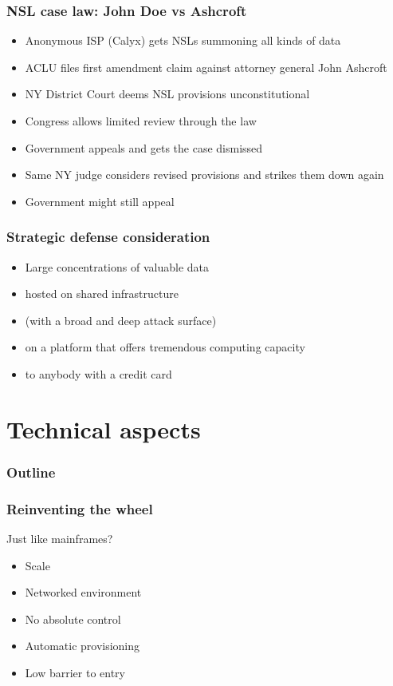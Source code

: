 \documentclass{beamer}
\begin{document}
\begin{frame}
    \frametitle{NSL case law: John Doe vs Ashcroft}
    \begin{itemize}
    \item Anonymous ISP (Calyx) gets NSLs summoning all kinds of data
    \item ACLU files first amendment claim against attorney general John Ashcroft
    \item NY District Court deems NSL provisions unconstitutional
    \item Congress allows limited review through the law
    \item Government appeals and gets the case dismissed
    \item Same NY judge considers revised provisions and strikes them down again
    \item Government might still appeal
    \end{itemize}
\end{frame}

\begin{frame}
    \frametitle{Strategic defense consideration}
    \begin{itemize}
      \item Large concentrations of valuable data
      \item hosted on shared infrastructure
      \item (with a broad and deep attack surface)
      \item on a platform that offers tremendous computing capacity
      \item to anybody with a credit card
    \end{itemize}
\end{frame}

\section{Technical aspects}

\begin{frame}
  \frametitle{Outline}
\end{frame}

\begin{frame}
    \frametitle{Reinventing the wheel}
    Just like mainframes?
    \begin{itemize}
    \item Scale
    \item Networked environment
    \item No absolute control
    \item Automatic provisioning
    \item Low barrier to entry
    \end{itemize}
\end{frame}
\end{document}
